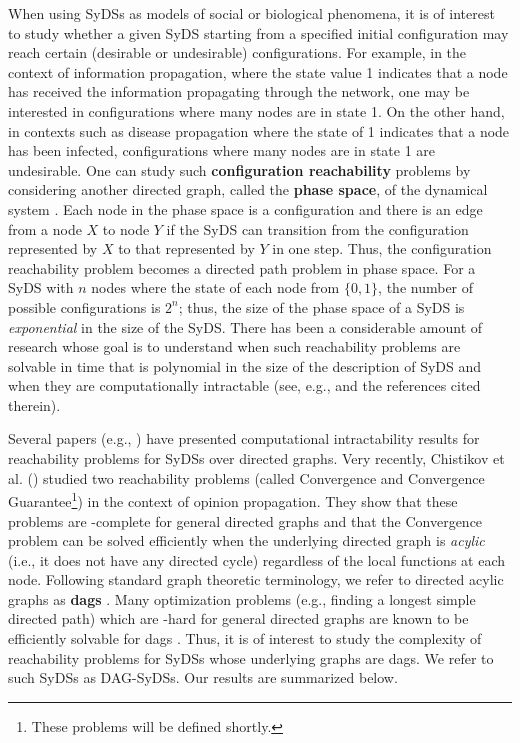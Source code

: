 When using SyDSs as models of social or biological phenomena, it is of interest 
to study whether a given SyDS starting from a specified
initial configuration  may reach certain
(desirable or undesirable) configurations.
For example, in the context of information propagation, where the
state value 1 indicates that a node has received the information
propagating through the network,
one may be interested in configurations where many nodes are in state 1.
On the other hand, in contexts such as disease propagation where
the state of 1 indicates that a node has been infected,
configurations where many nodes are in state 1 are undesirable.
One can study such \textbf{configuration reachability} problems
by considering another directed graph,
called the \textbf{phase space}, of the dynamical system \cite{MR-2007}.
Each node in the phase space is a configuration and there is an
edge from a node $X$ to node $Y$ if the SyDS can transition from
the configuration represented by $X$ to that represented by
$Y$ in one step.
Thus, the configuration reachability problem becomes a directed
path problem in phase space.
For a SyDS with $n$ nodes where the state of each node from $\{0,1\}$,
the number of possible configurations is $2^n$; thus, the size of
the phase space of a SyDS is \emph{exponential} in the size of
the SyDS.
There has been a considerable amount of research whose goal is
to understand when such reachability problems are solvable
in time that is polynomial in the size of the description of SyDS 
and when they are computationally intractable 
(see, e.g., \cite{Chistikov-etal-2020,BH+06,OU-2020,OU-2017,Akutsu-etal-2007}
and the references cited therein).

Several papers (e.g., \cite{OU-2017,Akutsu-etal-2007}) have
presented computational intractability results for reachability 
problems for SyDSs over directed graphs.
Very recently, Chistikov et al. (\citeyear{Chistikov-etal-2020})
studied two reachability problems (called Convergence and Convergence
Guarantee\footnote{These problems will be defined shortly.}) 
in the context of opinion propagation.
They show that these problems are \cpsp-complete for general
directed graphs and
that the Convergence problem can be solved
efficiently when the underlying directed graph is \emph{acylic} (i.e.,
it does not have any directed cycle) regardless of the local functions
at each node.
Following standard graph theoretic terminology, we refer to directed
acylic graphs as \textbf{dags} \cite{CLRS-2009}.
Many optimization problems (e.g., finding a longest simple directed path) which
are \cnp-hard for general directed graphs are known to be efficiently
solvable for dags \cite{GJ-1979}.
Thus, it is of interest to study the complexity of reachability problems for
SyDSs whose underlying graphs are dags.
We refer to such SyDSs as DAG-SyDSs.
Our results are summarized below.

